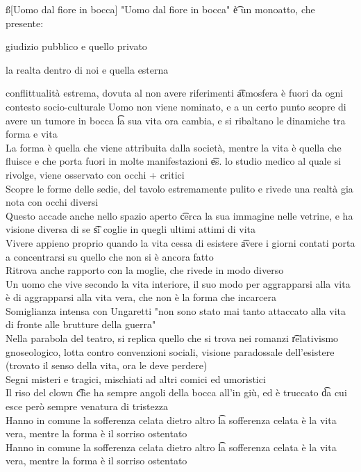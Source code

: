 \documentclass[12pt]{article}
\begin{document}
\ss[Uomo dal fiore in bocca]
"Uomo dal fiore in bocca" \t è un monoatto, che presente:
\bi
  \item giudizio pubblico e quello privato
  \item la realta dentro di noi e quella esterna
  \item conflittualità estrema, dovuta al non avere riferimenti \t atmosfera è fuori da ogni contesto socio-culturale
\ei
Uomo non viene nominato, e a un certo punto scopre di avere un tumore in bocca \t la sua vita ora cambia, e si ribaltano le dinamiche tra forma e vita \\
La forma è quella che viene attribuita dalla società, mentre la vita è quella che fluisce e che porta fuori in molte manifestazioni \t es. lo studio medico al quale si rivolge, viene osservato con occhi + critici \\
Scopre le forme delle sedie, del tavolo estremamente pulito e rivede una realtà gia nota con occhi diversi \\
Questo accade anche nello spazio aperto \t cerca la sua immagine nelle vetrine, e ha visione diversa di se \t si coglie in quegli ultimi attimi di vita \\
Vivere appieno proprio quando la vita cessa di esistere \t avere i giorni contati porta a concentrarsi su quello che non si è ancora fatto \\
Ritrova anche rapporto con la moglie, che rivede in modo diverso \\
Un uomo che vive secondo la vita interiore, il suo modo per aggrapparsi alla vita è di aggrapparsi alla vita vera, che non è la forma che incarcera \\
Somiglianza intensa con Ungaretti "non sono stato mai tanto attaccato alla vita di fronte alle brutture della guerra" \\
Nella parabola del teatro, si replica quello che si trova nei romanzi \t relativismo gnoseologico, lotta contro convenzioni sociali, visione paradossale dell'esistere (trovato il senso della vita, ora le deve perdere) \\
Segni misteri e tragici, mischiati ad altri comici ed umoristici \\
Il riso del clown \t che ha sempre angoli della bocca all'in giù, ed è truccato \t da cui esce però sempre venatura di tristezza \\
Hanno in comune la sofferenza celata dietro altro \t la sofferenza celata è la vita vera, mentre la forma è il sorriso ostentato \\
Hanno in comune la sofferenza celata dietro altro \t la sofferenza celata è la vita vera, mentre la forma è il sorriso ostentato
\end{document}

